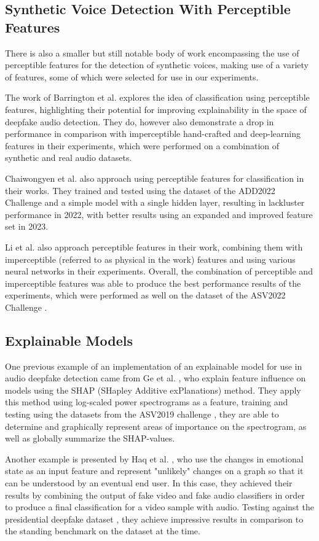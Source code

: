 \documentclass{article}
\begin{document}
	\subsection{Synthetic Voice Detection With Perceptible Features}
	There is also a smaller but still notable body of work encompassing the use of perceptible
	features for the detection of synthetic voices, making use of a variety of features, some of
	which were selected for use in our experiments.
	\par
	The work of Barrington et al. \cite{barrington_single_2023} explores the idea of classification
	using perceptible features, highlighting their potential for improving explainability in the
	space of deepfake audio detection. They do, however also demonstrate a drop in performance in
	comparison with imperceptible hand-crafted and deep-learning features in their experiments,
	which were performed on a combination of synthetic and real audio datasets.
	\par
	Chaiwongyen et al. \cite{chaiwongyen_contribution_2022,chaiwongyen_deepfake-speech_2023} also
	approach using perceptible features for classification in their works. They trained and tested
	using the dataset of the ADD2022 Challenge \cite{yi_add_2024} and a simple model with a single
	hidden layer, resulting in lackluster performance in 2022, with better results using an
	expanded and improved feature set in 2023.
	\par
	Li et al. \cite{li_comparative_2022} also approach perceptible features in their work,
	combining them with imperceptible (referred to as physical in the work) features and using
	various neural networks in their experiments. Overall, the combination of perceptible and
	imperceptible features was able to produce the best performance results of the experiments,
	which were performed as well on the dataset of the ASV2022 Challenge \cite{yi_add_2024}.
	\subsection{Explainable Models}
	One previous example of an implementation of an explainable model for use in audio deepfake
	detection came from Ge et al. \cite{ge_explaining_2024}, who explain feature influence on
	models using the SHAP (SHapley Additive exPlanations) method. They apply this method using
	log-scaled power spectrograms as a feature, training and testing using the datasets from the
	ASV2019 challenge \cite{wang_asvspoof_2020}, they are able to determine and graphically
	represent areas of importance on the spectrogram, as well as globally summarize the
	SHAP-values.
	\par
	Another example is presented by Haq et al. \cite{haq_multimodal_2023}, who use
	the changes in emotional state as an input feature and represent "unlikely" changes on a graph
	so that it can be understood by an eventual end user. In this case, they achieved their
	results by combining the output of fake video and fake audio classifiers in order to produce a
	final classification for a video sample with audio. Testing against the presidential deepfake
	dataset \cite{sankaranarayanan_presidential_nodate}, they achieve impressive results in
	comparison to the standing benchmark on the dataset at the time.
\end{document}
